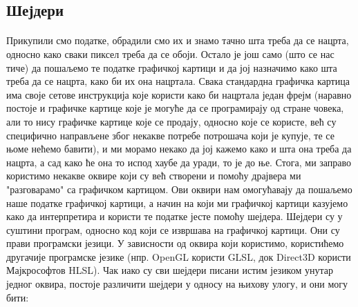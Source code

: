 \documentclass[12pt]{article}
\begin{document}
	\subsection{Шејдери}
	\paragraph{}
	Прикупили смо податке, обрадили смо их и знамо тачно шта треба да се нацрта, односно како сваки пиксел треба да се обоји. Остало је још само (што се нас тиче) да пошаљемо те податке графичкој картици и да јој назначимо како шта треба да се нацрта, како би их она нацртала. Свака стандардна графичка картица има своје сетове инструкција које користи како би нацртала један фрејм (наравно постоје и графичке картице које је могуће да се програмирају од стране човека, али то нису графичке картице које се продају, односно које се користе, већ су специфично направљене због некакве потребе потрошача који је купује, те се њоме нећемо бавити), и ми морамо некако да јој кажемо како и шта она треба да нацрта, а сад како ће она то испод хаубе да уради, то је до ње. Стога, ми заправо користимо некакве оквире који су већ створени и помоћу драјвера ми "разговарамо" са графичком картицом. Ови оквири нам омогућавају да пошаљемо наше податке графичкој картици, а начин на који ми графичкој картици казујемо како да интерпретира и користи те податке јесте помоћу шејдера. Шејдери су у суштини програм, односно код који се извршава на графичкој картици. Они су прави програмски језици. У зависности од оквира који користимо, користићемо другачије програмске језике (нпр. OpenGL користи GLSL, док Direct3D користи Мајкрософтов HLSL). Чак иако су сви шејдери писани истим језиком унутар једног оквира, постоје различити шејдери у односу на њихову улогу, и они могу бити:
\end{document}
